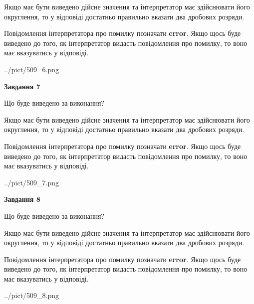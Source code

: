 \documentclass[12pt, ukrainian]{article}
\begin{document}
{\begin {Large}
Якщо має бути виведено дійсне значення та інтерпретатор має здійснювати його округлення, 
то у відповіді достатньо правильно вказати два дробових розряди.

Повідомлення інтерпретатора про помилку позначати \textbf{error}.
Якщо щось буде виведено до того, як інтерпретатор видасть повідомлення про помилку, 
то воно має вказуватись у відповіді. \par

\begin{center}
	{../pict/509_6.png}
\end{center}
\newpage

{\begin {center}\textbf{Завдання 7}\end {center}}\par
Що буде виведено за виконання? \par

Якщо має бути виведено дійсне значення та інтерпретатор має здійснювати його округлення, 
то у відповіді достатньо правильно вказати два дробових розряди.

Повідомлення інтерпретатора про помилку позначати \textbf{error}.
Якщо щось буде виведено до того, як інтерпретатор видасть повідомлення про помилку, 
то воно має вказуватись у відповіді. \par

\begin{center}
	{../pict/509_7.png}
\end{center}
\newpage

{\begin {center}\textbf{Завдання 8}\end {center}}\par
Що буде виведено за виконання? \par

Якщо має бути виведено дійсне значення та інтерпретатор має здійснювати його округлення, 
то у відповіді достатньо правильно вказати два дробових розряди.

Повідомлення інтерпретатора про помилку позначати \textbf{error}.
Якщо щось буде виведено до того, як інтерпретатор видасть повідомлення про помилку, 
то воно має вказуватись у відповіді. \par

\begin{center}
	{../pict/509_8.png}
\end{center}
\newpage


\end{Large}}
\end{document}
